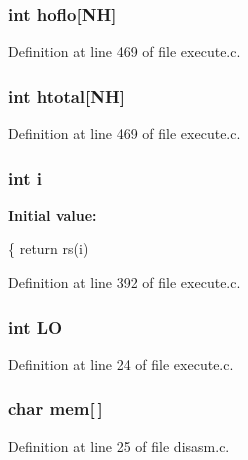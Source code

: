 \subsubsection[{hoflo}]{\setlength{\rightskip}{0pt plus 5cm}int hoflo[{\bf NH}]}\label{execute_8c_ab117349ce637e2d9b53591266b11eba0}


Definition at line 469 of file execute.\+c.

\subsubsection[{htotal}]{\setlength{\rightskip}{0pt plus 5cm}int htotal[{\bf NH}]}\label{execute_8c_abfe283d900b27cca46987953c9eb9749}


Definition at line 469 of file execute.\+c.

\subsubsection[{i}]{\setlength{\rightskip}{0pt plus 5cm}int i}\label{execute_8c_acb559820d9ca11295b4500f179ef6392}
{\bfseries Initial value\+:}
\begin{DoxyCode}
\{
    \textcolor{keywordflow}{return} rs(i)
\end{DoxyCode}


Definition at line 392 of file execute.\+c.

\subsubsection[{LO}]{\setlength{\rightskip}{0pt plus 5cm}int LO}\label{execute_8c_a9192c37abac524f0f61876f8b33f6999}


Definition at line 24 of file execute.\+c.

\subsubsection[{mem}]{\setlength{\rightskip}{0pt plus 5cm}char mem[$\,$]}\label{execute_8c_abba2b58d12066c22a7000e0882e8c5bb}


Definition at line 25 of file disasm.\+c.


